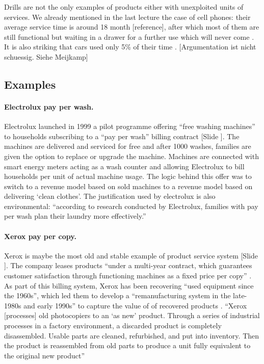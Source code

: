 \documentclass{article}
\newcounter{slide}
\begin{document}
Drills are not the only examples of products either with unexploited units of services. We already mentioned in the last lecture the case of cell phones: their average service time is around 18 month [reference], after which most of them are still functional but waiting in a drawer for a further use which will never come \cite{hanson2014s}. It is also striking that cars used only 5\% of their time \cite{meijkampChangingConsumerBehaviour1999}. {\color{red}[Argumentation ist nicht schuessig. Siehe Meijkamp]}

\subsection{Examples}
\label{sec:pssExamples}

\paragraph{Electrolux pay per wash.}\label{Electrolux}
Electrolux launched in 1999 a pilot programme offering ``free washing machines'' to households subscribing to a ``pay per wash'' billing contract \href{https://www.electroluxgroup.com/en/electrolux-offers-7000-households-free-washing-machines-1885/}{\cite{eletroluxElectroluxOffers0001999}} {\color{blue}[Slide ]}. The machines are delivered and serviced for free and after 1000 washes, families are given the option to replace or upgrade the machine. Machines are connected with smart energy meters acting as a wash counter and allowing Electrolux to bill households per unit of actual machine usage. The logic behind this offer was to switch to a revenue model based on sold machines to a revenue model based on delivering `clean clothes'. The justification used by electrolux is also environmental: ``according to research conducted by Electrolux, families with pay per wash plan their laundry more effectively.''

\paragraph{Xerox pay per copy.}\label{Xerox}
Xerox is maybe the most old and stable example of product service system {\color{blue}[Slide ]}. The company leases products ``under a multi-year contract, which guarantees customer satisfaction through functioning machines as a fixed price per copy'' \cite{montProductserviceSystemsPanacea2004}. As part of this billing system, Xerox has been recovering ``used equipment since the 1960s'', which led them to develop a ``remanufacturing system in the late-1980s and early 1990s'' to capture the value of of recovered products \cite{kingPhotocopierRemanufacturingXerox2006}. ``Xerox [processes] old photocopiers to an `as new' product. Through a series of industrial processes in a factory environment, a discarded product is completely disassembled. Usable parts are cleaned, refurbished, and put into inventory. Then the product is reassembled from old parts to produce a unit fully equivalent to the original new product'' \cite{kingPhotocopierRemanufacturingXerox2006}
\end{document}
